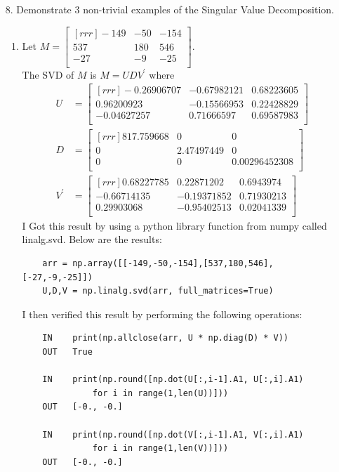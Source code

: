 \documentclass[12pt]{article}
\theoremstyle{definition}
\theoremstyle{plain}
\begin{document}
\begin{enumerate}
\item[8.]Demonstrate 3 non-trivial examples of the Singular Value Decomposition.
	\begin{enumerate}
	\item Let $M = \begin{bmatrix}[rrr]-149&-50&-154\\537&180&546\\-27&-9&-25\\\end{bmatrix}$.\\
	The SVD of $M$ is $M=UDV^\prime$ where
	\begin{align*}
	U&=\begin{bmatrix}[rrr]
	-0.26906707 & -0.67982121 & 0.68223605\\
	0.96200923 & -0.15566953 & 0.22428829\\
	-0.04627257 & 0.71666597 & 0.69587983\\\end{bmatrix}\\
	D&=\begin{bmatrix}[rrr]
	817.759668 & 0 & 0\\
	0 & 2.47497449 & 0\\
	0 & 0 & 0.00296452308\\\end{bmatrix}\\
	V^\prime &= \begin{bmatrix}[rrr]
	0.68227785 & 0.22871202 & 0.6943974\\
 	-0.66714135 & -0.19371852 & 0.71930213\\
 	0.29903068 & -0.95402513 & 0.02041339\\\end{bmatrix}
 	\end{align*}
 	I Got this result by using a python library function from numpy called linalg.svd. Below are the results:
 	\begin{verbatim}
	arr = np.array([[-149,-50,-154],[537,180,546],[-27,-9,-25]])
	U,D,V = np.linalg.svd(arr, full_matrices=True)
 	\end{verbatim}
 	I then verified this result by performing the following operations:
 	\begin{verbatim}
	IN    print(np.allclose(arr, U * np.diag(D) * V))
	OUT   True
 	
	IN    print(np.round([np.dot(U[:,i-1].A1, U[:,i].A1) 
	          for i in range(1,len(U))]))
	OUT   [-0., -0.]
	
	IN    print(np.round([np.dot(V[:,i-1].A1, V[:,i].A1) 
	          for i in range(1,len(V))]))
	OUT   [-0., -0.]
	

\end{verbatim}
\end{enumerate}
\end{enumerate}
\end{document}
